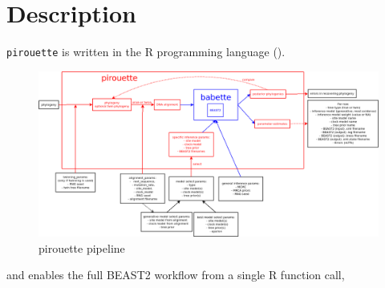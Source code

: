\documentclass{article}
\begin{document}


\section{Description}

\verb;pirouette; is written in the R programming language (\cite{R}).

\begin{figure}
  \centering
  \includegraphics[width=\textwidth]{overview.png}
  \caption{pirouette pipeline}
  \label{fig:pipeline}
\end{figure}

and enables the full BEAST2 workflow from a single R function call,
\end{document}
